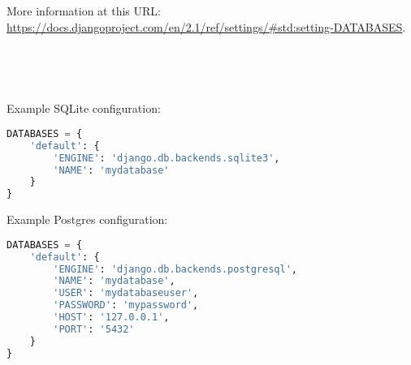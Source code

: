         More information at this URL: \url{https://docs.djangoproject.com/en/2.1/ref/settings/#std:setting-DATABASES}.
        
        ~
        
        {\centering
        
        
        }
        
        ~
        
        Example SQLite configuration:
        \begin{lstlisting}[language=python]
DATABASES = {
    'default': {
        'ENGINE': 'django.db.backends.sqlite3',
        'NAME': 'mydatabase'
    }
}
        \end{lstlisting}
        
        Example Postgres configuration:
        \begin{lstlisting}[language=python]
DATABASES = {
    'default': {
        'ENGINE': 'django.db.backends.postgresql',
        'NAME': 'mydatabase',
        'USER': 'mydatabaseuser',
        'PASSWORD': 'mypassword',
        'HOST': '127.0.0.1',
        'PORT': '5432'
    }
}
        \end{lstlisting}
